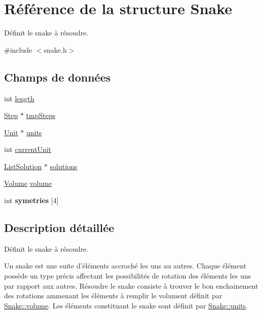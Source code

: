 \hypertarget{struct_snake}{\section{Référence de la structure Snake}
\label{struct_snake}
}


Définit le snake à résoudre.  




{\ttfamily \#include $<$snake.\-h$>$}

\subsection*{Champs de données}
\begin{DoxyCompactItemize}
\item 
int \hyperlink{struct_snake_af9d495c1655d813d553030485d00fea7}{length}
\item 
\hyperlink{struct_step}{Step} $\ast$ \hyperlink{struct_snake_a99a4f4239fb1568fe35d9a081c9b2660}{tmp\-Steps}
\item 
\hyperlink{group___snake_gabceb2331ad056e3c5ad27894199a49ed}{Unit} $\ast$ \hyperlink{struct_snake_a2ff02817760e56a95b3b1bc7cfa1b77b}{units}
\item 
int \hyperlink{struct_snake_a1e5f8a70f50d68340f54ac884c05dcff}{current\-Unit}
\item 
\hyperlink{struct_list_solution}{List\-Solution} $\ast$ \hyperlink{struct_snake_a97be9d71c3998b7a3a97e9403e375979}{solutions}
\item 
\hyperlink{struct_volume}{Volume} \hyperlink{struct_snake_a9bc498ccac8db41438f855f5dd3f4c05}{volume}
\item 
\hypertarget{struct_snake_a9bb94a758344ce8b7ebf170b8389fa36}{int {\bfseries symetries} \mbox{[}4\mbox{]}}\label{struct_snake_a9bb94a758344ce8b7ebf170b8389fa36}

\end{DoxyCompactItemize}


\subsection{Description détaillée}
Définit le snake à résoudre. 

Un snake est une suite d'éléments accroché les uns au autres. Chaque élément possède un type précis affectant les possibilités de rotation des éléments les uns par rapport aux autres. Résoudre le snake consiste à trouver le bon enchainement des rotations ammenant les éléments à remplir le volument définit par \hyperlink{struct_snake_a9bc498ccac8db41438f855f5dd3f4c05}{Snake\-::volume}. Les éléments constituant le snake sont définit par \hyperlink{struct_snake_a2ff02817760e56a95b3b1bc7cfa1b77b}{Snake\-::units}. 

